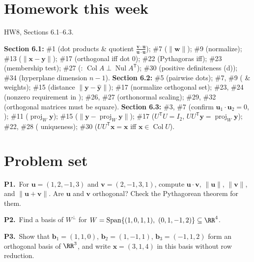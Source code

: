 \documentclass[10pt]{scrartcl}
\newcommand{\vv}[1]{\mathbf{#1}}
\DeclareMathOperator{\spn}{Span}\DeclareMathOperator{\Nul}{Nul}\DeclareMathOperator{\Col}{Col}\DeclareMathOperator{\Row}{Row}\DeclareMathOperator{\tr}{tr}\DeclareMathOperator{\proj}{proj}\DeclareMathOperator{\dist}{dist}
\begin{document}
\section{Homework this week}
HW8, Sections 6.1--6.3.
\begin{itemize}
  \ii \textbf{Section 6.1:} \#1 (dot products \& quotient $\frac{\vv v\cdot\vv u}{\vv u\cdot\vv u}$); \#7 ($\|\vv w\|$); \#9 (normalize); \#13 ($\|\vv x-\vv y\|$); \#17 (orthogonal iff dot $0$); \#22 (Pythagoras iff); \#23 (membership test); \#27 (: $\Col A\perp\Nul A^{\mathsf T}$); \#30 (positive definiteness (d)); \#34 (hyperplane dimension $n-1$).
  \ii \textbf{Section 6.2:} \#5 (pairwise dots); \#7, \#9 ( \&  weights); \#15 (distance $\|\vv y-\hat{\vv y}\|$); \#17 (normalize orthogonal set); \#23, \#24 (nonzero requirement in ); \#26, \#27 (orthonormal scaling); \#29, \#32 (orthogonal matrices must be square).
  \ii \textbf{Section 6.3:} \#3, \#7 (confirm $\vv u_1\cdot\vv u_2=0$, ); \#11 ($\proj_W\vv y$); \#15 ($\|\vv y-\proj_W\vv y\|$); \#17 ($U^{\mathsf T}U=I_2$, $UU^{\mathsf T}\vv y=\proj_W\vv y$); \#22, \#28 ( uniqueness); \#30 ($UU^{\mathsf T}\vv x=\vv x$ iff $\vv x\in\Col U$).
\end{itemize}

\section{Problem set}

\begin{prob}
  \textbf{P1.}\ For $\vv u=(1,2,-1,3)$ and $\vv v=(2,-1,3,1)$, compute $\vv u\cdot\vv v$, $\|\vv u\|$, $\|\vv v\|$, and $\|\vv u+\vv v\|$. Are $\vv u$ and $\vv v$ orthogonal? Check the Pythagorean theorem for them.
\end{prob}

\begin{prob}
  \textbf{P2.}\ Find a basis of $W^\perp$ for $W=\spn\{(1,0,1,1),\ (0,1,-1,2)\}\subseteq\RR^4$.
\end{prob}

\begin{prob}
  \textbf{P3.}\ Show that $\vv b_1=(1,1,0)$, $\vv b_2=(1,-1,1)$, $\vv b_3=(-1,1,2)$ form an orthogonal basis of $\RR^3$, and write $\vv x=(3,1,4)$ in this basis without row reduction.
\end{prob}
\end{document}
